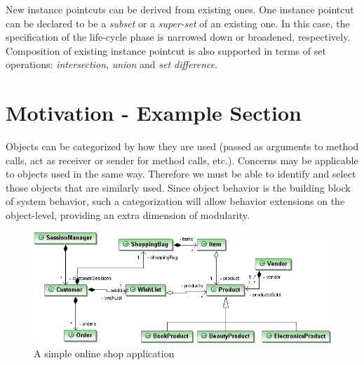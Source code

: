 New instance pointcuts can be derived from existing ones. One instance pointcut can be declared to be a \emph{subset} or a \emph{super-set} of an existing one.
In this case, the specification of the life-cycle phase is narrowed down or broadened, respectively.
Composition of existing instance pointcut is also supported in terms of set operations: \emph{intersection}, \emph{union} and \emph{set difference}. 



\section{Motivation - Example Section}
\label{sect:motivation}

Objects can be categorized by how they are used (passed as arguments to method calls, act as receiver or sender for method calls, etc.). Concerns may be applicable to objects used in the same way. Therefore we must be able to identify and select those objects that are similarly used. Since object behavior is the building block of system behavior, such a categorization will allow behavior extensions on the object-level, providing an extra dimension of modularity.

\begin{figure}[h]
\includegraphics[width=\textwidth]{images/myonlineshop.png}%
\caption{A simple online shop application}%
\label{fig:shop}%
\end{figure}

